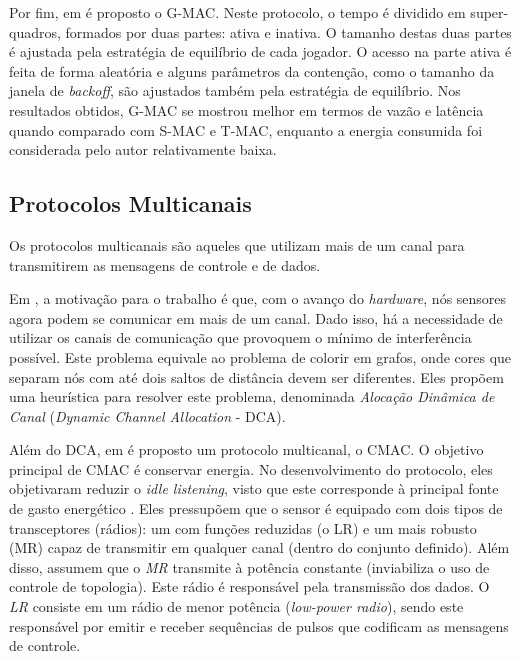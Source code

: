 \documentclass[12pt]{article}
\begin{document}
    Por fim, em \cite{20093112234782} é proposto o G-MAC. Neste protocolo, o tempo é dividido em super-quadros, formados por duas partes: ativa e inativa. O tamanho destas duas partes é ajustada pela estratégia de equilíbrio de cada jogador. O acesso na parte ativa é feita de forma aleatória e alguns parâmetros da contenção, como o tamanho da janela de \textit{backoff}, são ajustados também pela estratégia de equilíbrio. Nos resultados obtidos, G-MAC se mostrou melhor em termos de vazão e latência quando comparado com S-MAC e T-MAC, enquanto a energia consumida foi considerada pelo autor relativamente baixa.

  \subsection{Protocolos Multicanais}
    Os protocolos multicanais \cite{20084511683228, 20093812310584, 20083911592812} são aqueles que utilizam mais de um canal para transmitirem as mensagens de controle e de dados.
  
    Em \cite{20084511683228}, a motivação para o trabalho é que, com o avanço do \textit{hardware}, nós sensores agora podem se comunicar em mais de um canal. Dado isso, há a necessidade de utilizar os canais de comunicação que provoquem o mínimo de interferência possível. Este problema equivale ao problema de colorir em grafos, onde cores que separam nós com até dois saltos de distância devem ser diferentes. Eles propõem uma heurística para resolver este problema, denominada \emph{Alocação Dinâmica de Canal} (\textit{Dynamic Channel Allocation} - DCA).

    Além do DCA, em \cite{20084511683228} é proposto um protocolo multicanal, o CMAC. O objetivo principal de CMAC é conservar energia. No desenvolvimento do protocolo, eles objetivaram reduzir o \textit{idle listening}, visto que este corresponde à principal fonte de gasto energético \cite{Reason04}. Eles pressupõem que o sensor é equipado com dois tipos de transceptores (rádios): um com funções reduzidas (o LR) e um mais robusto (MR) capaz de transmitir em qualquer canal (dentro do conjunto definido). Além disso, assumem que o \emph{MR} transmite à potência constante (inviabiliza o uso de controle de topologia). Este rádio é responsável pela transmissão dos dados. O \emph{LR} consiste em um rádio de menor potência (\textit{low-power radio}), sendo este responsável por emitir e receber sequências de pulsos que codificam as mensagens de controle.
\end{document}
